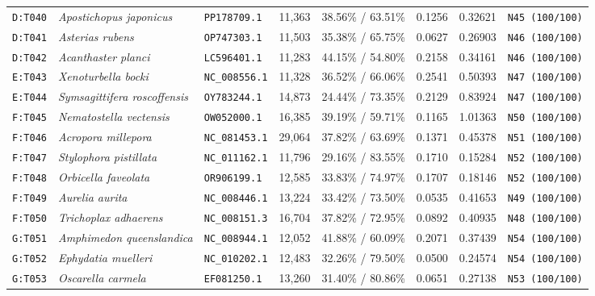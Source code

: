\documentclass[10pt,letterpaper]{article}
\begin{document}
\begin{longtable}{llllllll}
\texttt{D:T040} & \textit{Apostichopus japonicus} & \texttt{PP178709.1} & 11,363 & 38.56\% / 63.51\% & 0.1256 & 0.32621 & \texttt{N45 (100/100)} \\
\texttt{D:T041} & \textit{Asterias rubens} & \texttt{OP747303.1} & 11,503 & 35.38\% / 65.75\% & 0.0627 & 0.26903 & \texttt{N46 (100/100)} \\
\texttt{D:T042} & \textit{Acanthaster planci} & \texttt{LC596401.1} & 11,283 & 44.15\% / 54.80\% & 0.2158 & 0.34161 & \texttt{N46 (100/100)} \\
\texttt{E:T043} & \textit{Xenoturbella bocki} & \texttt{NC\_008556.1} & 11,328 & 36.52\% / 66.06\% & 0.2541 & 0.50393 & \texttt{N47 (100/100)} \\
\texttt{E:T044} & \textit{Symsagittifera roscoffensis} & \texttt{OY783244.1} & 14,873 & 24.44\% / 73.35\% & 0.2129 & 0.83924 & \texttt{N47 (100/100)} \\
\texttt{F:T045} & \textit{Nematostella vectensis} & \texttt{OW052000.1} & 16,385 & 39.19\% / 59.71\% & 0.1165 & 1.01363 & \texttt{N50 (100/100)} \\
\texttt{F:T046} & \textit{Acropora millepora} & \texttt{NC\_081453.1} & 29,064 & 37.82\% / 63.69\% & 0.1371 & 0.45378 & \texttt{N51 (100/100)} \\
\texttt{F:T047} & \textit{Stylophora pistillata} & \texttt{NC\_011162.1} & 11,796 & 29.16\% / 83.55\% & 0.1710 & 0.15284 & \texttt{N52 (100/100)} \\
\texttt{F:T048} & \textit{Orbicella faveolata} & \texttt{OR906199.1} & 12,585 & 33.83\% / 74.97\% & 0.1707 & 0.18146 & \texttt{N52 (100/100)} \\
\texttt{F:T049} & \textit{Aurelia aurita} & \texttt{NC\_008446.1} & 13,224 & 33.42\% / 73.50\% & 0.0535 & 0.41653 & \texttt{N49 (100/100)} \\
\texttt{F:T050} & \textit{Trichoplax adhaerens} & \texttt{NC\_008151.3} & 16,704 & 37.82\% / 72.95\% & 0.0892 & 0.40935 & \texttt{N48 (100/100)} \\
\texttt{G:T051} & \textit{Amphimedon queenslandica} & \texttt{NC\_008944.1} & 12,052 & 41.88\% / 60.09\% & 0.2071 & 0.37439 & \texttt{N54 (100/100)} \\
\texttt{G:T052} & \textit{Ephydatia muelleri} & \texttt{NC\_010202.1} & 12,483 & 32.26\% / 79.50\% & 0.0500 & 0.24574 & \texttt{N54 (100/100)} \\
\texttt{G:T053} & \textit{Oscarella carmela} & \texttt{EF081250.1} & 13,260 & 31.40\% / 80.86\% & 0.0651 & 0.27138 & \texttt{N53 (100/100)} \\

\end{longtable}
\end{document}
